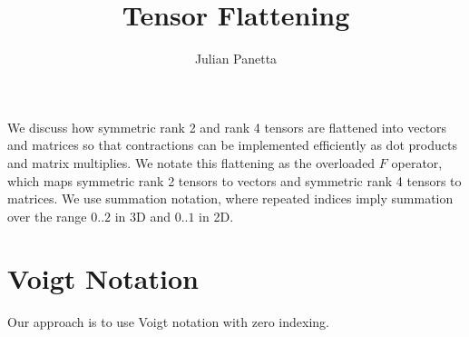 \documentclass[10pt]{article}
\title{Tensor Flattening}
\author{Julian Panetta}
\begin{document}
\maketitle

We discuss how symmetric rank 2 and rank 4 tensors are flattened into vectors
and matrices so that contractions can be implemented efficiently as dot products
and matrix multiplies. We notate this flattening as the overloaded $F$ operator,
which maps symmetric rank 2 tensors to vectors and symmetric rank 4 tensors to
matrices. We use summation notation, where repeated indices imply summation
over the range $0..2$ in 3D and $0..1$ in 2D.

\section{Voigt Notation}
Our approach is to use Voigt notation with zero indexing.
\end{document}
